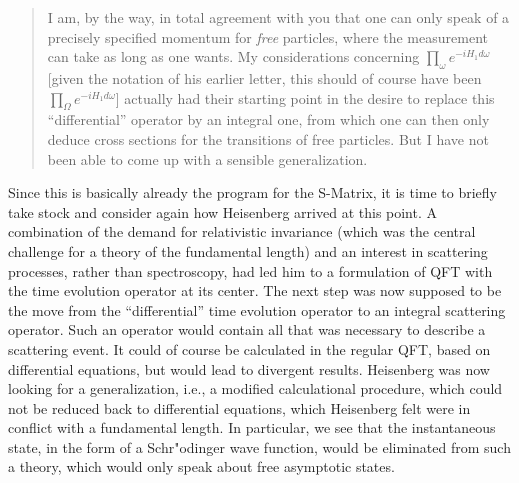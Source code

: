 \documentclass[12pt]{article}
\begin{document}
\begin{quote}
I am, by the way, in total agreement with you that one can only speak of a precisely specified momentum for \emph{free} particles, where the measurement can take as long as one wants. My considerations concerning $\prod_{\omega} e^{-i H_1 d \omega}$ [given the notation of his earlier letter, this should of course have been $\prod_{\Omega} e^{-i H_1 d \omega}$]  actually had their starting point in the desire to replace this ``differential'' operator by an integral one, from which one can then only deduce cross sections for the transitions of free particles. But I have not been able to come up with a sensible generalization.
\end{quote}

Since this is basically already the program for the S-Matrix, it is time to briefly take stock and consider again how Heisenberg arrived at this point. A combination of the demand for relativistic invariance (which was the central challenge for a theory of the fundamental length) and an interest in scattering processes, rather than spectroscopy, had led him to a formulation of QFT with the time evolution operator at its center. The next step was now supposed to be the move from the ``differential'' time evolution operator to an integral scattering operator. Such an operator would contain all that was necessary to describe a scattering event. It could of course be calculated in the regular QFT, based on differential equations, but would lead to divergent results. Heisenberg was now looking for a generalization, i.e., a modified calculational procedure, which could not be reduced back to differential equations, which Heisenberg felt were in conflict with a fundamental length. In particular, we see that the instantaneous state, in the form of a Schr"odinger wave function, would be eliminated from such a theory, which would only speak about free asymptotic states.
\end{document}
